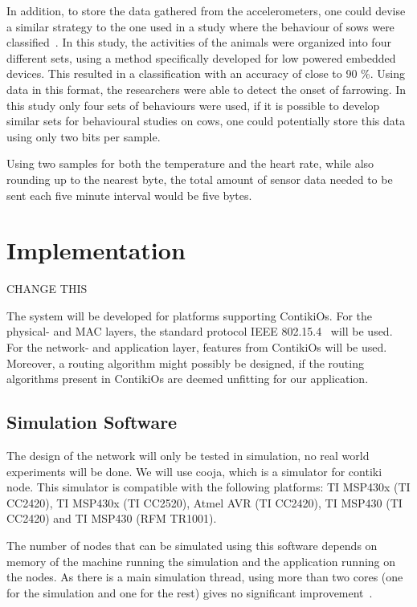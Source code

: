 \documentclass[conference]{IEEEtran}
\begin{document}
In addition, to store the data gathered from the accelerometers, one could
devise a similar strategy to the one used in a study where the behaviour of
sows were classified~\cite{marchiorosows2011}. In this study, the activities
of the animals were organized into four different sets, using a method
specifically developed for low powered embedded devices. This resulted in
a classification with an accuracy of close to 90 \%. Using data in this format,
the researchers were able to detect the onset of farrowing. In this study only
four sets of behaviours were used, if it is possible to develop similar sets
for behavioural studies on cows, one could potentially store this data using
only two bits per sample.

Using two samples for both the temperature and the heart rate, while also
rounding up to the nearest byte, the total amount of sensor data needed to be
sent each five minute interval would be five bytes.


\section{Implementation}

CHANGE THIS

The system will be developed for platforms supporting ContikiOs. For the
physical- and MAC layers, the standard protocol IEEE 802.15.4~\cite{ieee802154}
will be used.  For the network- and application layer, features from ContikiOs
will be used.  Moreover, a routing algorithm might possibly be designed, if the
routing algorithms present in ContikiOs are deemed unfitting for our
application. 

\subsection{Simulation Software}

The design of the network will only be tested in simulation, no real world
experiments will be done. We will use cooja, which is a simulator for contiki
node. This simulator is compatible with the following platforms: TI MSP430x (TI
CC2420), TI MSP430x (TI CC2520), Atmel AVR (TI CC2420), TI MSP430 (TI CC2420)
and TI MSP430 (RFM TR1001).

The number of nodes that can be simulated using this software depends on memory
of the machine running the simulation and the application running on the nodes.
As there is a main simulation thread, using more than two cores (one for the
simulation and one for the rest) gives no significant
improvement~\cite{contikidev}.
\end{document}
